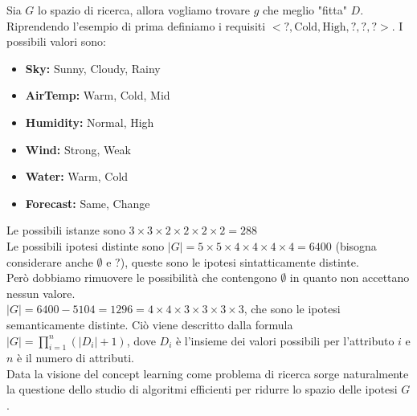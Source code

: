 \documentclass{../main.tex}[subfiles]
\begin{document}
Sia $G$ lo spazio di ricerca, allora vogliamo trovare $g$ che meglio "fitta" $D$. Riprendendo l'esempio di prima definiamo i requisiti $< ?, \text{Cold}, \text{High}, ?, ?, ? >$. I possibili valori sono:
\begin{itemize}
	\item \textbf{Sky:} Sunny, Cloudy, Rainy
	\item \textbf{AirTemp:} Warm, Cold, Mid
	\item \textbf{Humidity:} Normal, High
	\item \textbf{Wind:} Strong, Weak
	\item \textbf{Water:} Warm, Cold
	\item \textbf{Forecast:} Same, Change
\end{itemize}
Le possibili istanze sono $3 \times 3 \times 2 \times 2 \times 2 \times 2 = 288$\\
Le possibili ipotesi distinte sono $|G| = 5\times 5\times 4\times 4\times 4\times 4=6400$ (bisogna considerare anche $\emptyset$ e $?$), queste sono le ipotesi sintatticamente distinte.\\
Però dobbiamo rimuovere le possibilità che contengono $\emptyset$ in quanto non accettano nessun valore.\\
$|G|=6400 - 5104 = 1296 = 4 \times 4 \times 3 \times 3 \times 3 \times 3$, che sono le ipotesi semanticamente distinte.
Ciò viene descritto dalla formula $|G| = \prod_{i=1}^{n} (|D_i| + 1)$, dove $D_i$ è l'insieme dei valori possibili per l'attributo $i$ e $n$ è il numero di attributi.
\\
Data la visione del concept learning come problema di ricerca sorge naturalmente la questione dello studio di algoritmi efficienti per ridurre lo spazio delle ipotesi $G$.
\end{document}
